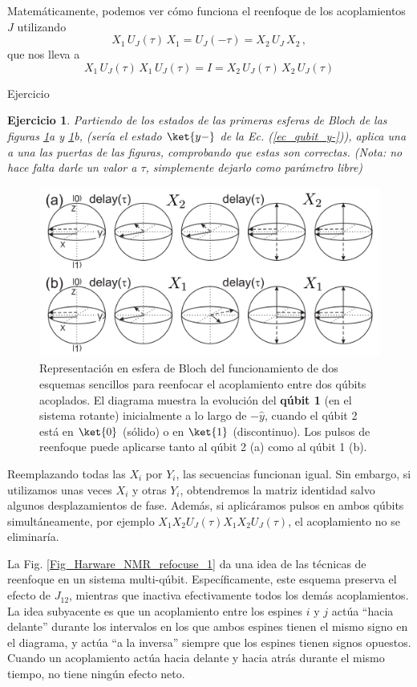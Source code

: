 \documentclass[a4paper,11pt]{book} %
\newtheorem{ejercicio_contador}{Ejercicio}
\newcommand{\Ejercicio}[1]{
		\begin{mybox_gray}{Ejercicio} 
			\begin{ejercicio_contador}
				 #1 
			\end{ejercicio_contador} 
		\end{mybox_gray}
	}
\numberwithin{equation}{chapter}
\begin{document}
Matemáticamente, podemos ver cómo funciona el reenfoque de los acoplamientos $J$ utilizando 
	\begin{equation}
	X_1 \, U_J(\tau) \, X_1 = U_J (- \tau) = X_2 \, U_J \, X_2 \, ,
	\end{equation}
que nos lleva a 
	\begin{equation}
	 X_1 \, U_J(\tau) \, X_1 \, U_J(\tau) = I =  X_2 \, U_J(\tau) \, X_2 \, U_J(\tau)
	\end{equation}

	\Ejercicio{
	Partiendo de los estados de las primeras esferas de Bloch de las figuras  \ref{Fig_Harware_NMR_refocusing}a y \ref{Fig_Harware_NMR_refocusing}b, (sería el estado $\ket{y-}$ de la Ec.    (\ref{ec_qubit_y-})), aplica una a una las puertas de las figuras, comprobando que estas son correctas. (Nota: no hace falta darle un valor a $\tau$, simplemente dejarlo como parámetro libre)
	}



	\begin{figure}[t]
	\centering 
	\includegraphics[width=0.7\linewidth]{Figuras/Fig_Harware_NMR_refocusing}
	\caption{Representación en esfera de Bloch del funcionamiento de dos esquemas sencillos para reenfocar el acoplamiento entre dos qúbits acoplados. El diagrama muestra la evolución del \textbf{qúbit 1} (en el sistema rotante) inicialmente a lo largo de $- \hat{y}$, cuando el qúbit 2 está en $\ket{0}$ (sólido) o en $\ket{1}$ (discontinuo). Los pulsos de reenfoque puede aplicarse tanto al  qúbit 2 (a) como al qúbit 1 (b).}
	\label{Fig_Harware_NMR_refocusing}
	\end{figure}


Reemplazando todas las $X_i$ por $Y_i$, las secuencias funcionan igual. Sin embargo, si utilizamos unas veces $X_i$ y otras $Y_i$, obtendremos la matriz identidad salvo algunos desplazamientos de fase. Además, si aplicáramos pulsos en ambos qúbits simultáneamente, por ejemplo $X_1X_2 U_J(\tau)X_1 X_2 U_J(\tau)$, el acoplamiento no se eliminaría. 

La Fig. \ref{Fig_Harware_NMR_refocuse_1} da una idea de las técnicas de reenfoque en un sistema multi-qúbit. Específicamente, este esquema preserva el efecto de $J_{12}$, mientras que inactiva efectivamente todos los demás acoplamientos. La idea subyacente es que un acoplamiento entre los espines $i$ y $j$ actúa ``hacia delante'' durante los intervalos en los que ambos espines tienen el mismo signo en el diagrama, y actúa ``a la inversa'' siempre que los espines tienen signos opuestos. Cuando un acoplamiento actúa hacia delante y hacia atrás durante el mismo tiempo, no tiene ningún efecto neto.
\end{document}
